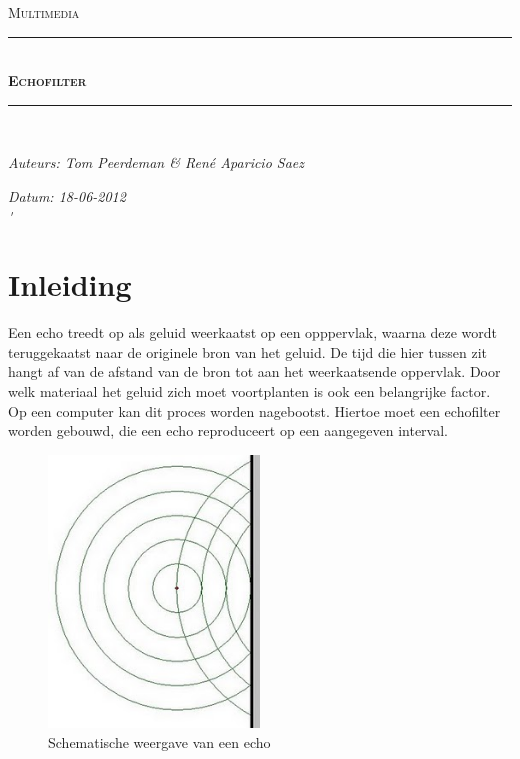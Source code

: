 \documentclass[a4paper]{article}
\newcommand{\HRule}{\rule{\linewidth}{0.5mm}}
\begin{document}
	\begin{titlepage}
	\begin{center}
		\textsc{\Large Multimedia}\\[0.5cm]
		\HRule \\[0,4cm]
		\textsc{\huge \bfseries Echofilter}
		\HRule \\[8cm]
		\begin{minipage}{0.4\textwidth}
			\begin{flushleft}\large
				\emph{Auteurs: Tom Peerdeman \& Ren\'e Aparicio Saez}\\
			\end{flushleft}
		\end{minipage}
		\begin{minipage}{0.4\textwidth}
			\begin{flushright}\large
			\emph{Datum: 18-06-2012\\\'}\\
			\end{flushright}
		\end{minipage}
	\end{center}
	\end{titlepage}

	\tableofcontents
	\newpage

	\section{Inleiding}\label{sec:inleiding}
		Een echo treedt op als geluid weerkaatst op een opppervlak, waarna deze wordt teruggekaatst naar de originele bron van het geluid. De tijd die hier tussen zit hangt af van de afstand van de bron tot aan het weerkaatsende oppervlak. Door welk materiaal het geluid zich moet voortplanten is ook een belangrijke factor.\\
Op een computer kan dit proces worden nagebootst. Hiertoe moet een echofilter worden gebouwd, die een echo reproduceert op een aangegeven interval.
\\[1.5cm]
	\begin{figure}[h]
		\begin{center}
			\includegraphics[width=0.5\textwidth]{echo.jpg}
			\caption{Schematische weergave van een echo}
		\end{center}
	\end{figure}
\newpage
\end{document}
